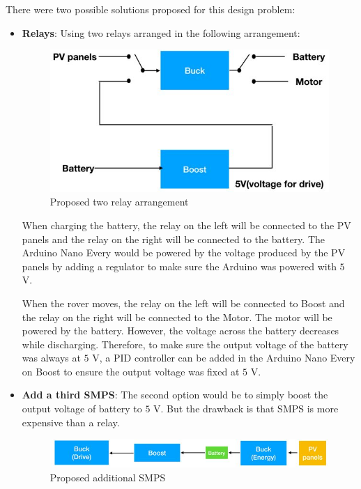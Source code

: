 \documentclass[11pt, a4paper]{article}
\begin{document}
There were two possible solutions proposed for this design problem:
\begin{itemize}
    \item \textbf{Relays}: Using two relays arranged in the following arrangement:
    \begin{figure} [h!]
        \centering
        \includegraphics[scale=0.5]{Energy_int.JPG}
        \caption{Proposed two relay arrangement}
    \end{figure}

    When charging the battery, the relay on the left will be connected to the PV panels and the relay on the right will be connected to the battery. The Arduino Nano Every would be powered by the voltage produced by the PV panels by adding a regulator to make sure the Arduino was powered with $5$ V.

    When the rover moves, the relay on the left will be connected to Boost and the relay on the right will be connected to the Motor. The motor will be powered by the battery. However, the voltage across the battery decreases while discharging. Therefore, to make sure the output voltage of the battery was always at $5$ V, a PID controller can be added in the Arduino Nano Every on Boost to ensure the output voltage was fixed at $5$ V.
    
    \item \textbf{Add a third SMPS}: The second option would be to simply boost the output voltage of battery to $5$ V. But the drawback is that SMPS is more expensive than a relay.
    \begin{figure} [h!]
        \centering
        \includegraphics[scale=0.6]{Energy_int2.JPG}
        \caption{Proposed additional SMPS}
    \end{figure}
    
\end{itemize}
\end{document}
